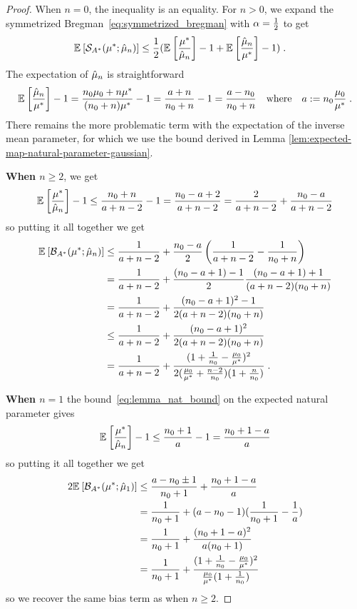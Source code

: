 \begin{subappendices}
\begin{proof}
When $n=0$, the inequality is an equality. 
For $n>0$, we expand the symmetrized Bregman~\eqref{eq:symmetrized_bregman} with $\alpha=\frac{1}{2}$ to get
\begin{align}
	\mathbb{E}_{} \left[ {\mathcal S}_{A^*}(\mu^*; \hat {\mu}_n) \right]  
	&\leq \frac{1}{2} (\mathbb{E}_{} \left[ \frac{\mu^*}{\hat {\mu}_n} \right]  -1  + \mathbb{E}_{} \left[ \frac{\hat {\mu}_n}{\mu^*} \right]  - 1) \; .
\end{align}
The expectation of $\hat {\mu}_n$ is straightforward
\begin{align}
	 \mathbb{E}_{} \left[ \frac{\hat {\mu}_n}{\mu^*} \right]  - 1 
	 = \frac{n_0 \mu_0 + n \mu^*}{(n_0+n)\mu^*} - 1 
	 = \frac{a+n}{n_0+n} - 1 = \frac{a - n_0}{n_0+n}
	 \quad \text{where} \quad
	 a:=n_0\frac{\mu_0}{\mu^*} \; .
\end{align}
There remains the more problematic term with the expectation of the inverse mean parameter, 
for which we use the bound derived in Lemma \ref{lem:expected-map-natural-parameter-gaussian}.

\textbf{When $n\geq 2$}, we get 
\begin{align}
	\mathbb{E}_{} \left[ \frac{\mu^*}{\hat {\mu}_n} \right]  - 1 
	\leq \frac{n_0 + n}{a +n - 2} -1
	= \frac{n_0 - a + 2}{a +n - 2}
	 = \frac{2}{a +n - 2} + \frac{n_0 - a}{a +n - 2}
\end{align}
so putting it all together we get 
\begin{align}
	\mathbb{E}_{} \left[ {\mathcal B}_{A^*}(\mu^*; \hat {\mu}_n) \right]  
	&\leq \frac{1}{a+n-2} + \frac{n_0-a}{2}  \left( \frac{1}{a+n-2} - \frac{1}{n_0+n} \right)\\
	&= \frac{1}{a+n-2} + \frac{(n_0-a + 1) - 1}{2}  \frac{(n_0 - a + 1) + 1}{(a+n-2)(n_0+n)} \\
	&= \frac{1}{a+n-2} + \frac{(n_0 - a +1)^2 - 1}{2(a+n-2)(n_0+n)} \\
	&\leq \frac{1}{a+n-2} + \frac{(n_0 - a +1)^2}{2(a+n-2)(n_0 + n)} \\
	&= \frac{1}{a+n-2} + \frac{(1 + \frac{1}{n_0} - \frac{\mu_0}{\mu^*})^2}{2 (\frac{\mu_0}{\mu^*}+\frac{n-2}{n_0})(1 + \frac{n}{n_0} )} \; .
\end{align}

\textbf{When $n=1$} the bound~\eqref{eq:lemma_nat_bound}  on the expected natural parameter gives
\begin{align}
	\mathbb{E}_{} \left[ \frac{\mu^*}{\hat {\mu}_n} \right]  - 1 
	\leq \frac{n_0 + 1}{a} -1
	= \frac{n_0 +1 - a}{a}
\end{align}
so putting it all together we get
\begin{align}
	2\mathbb{E}_{} \left[ {\mathcal B}_{A^*}(\mu^*; \hat \mu_1) \right]  
	&\leq \frac{a - n_0 \pm 1}{n_0 + 1}  + \frac{n_0 +1 - a }{a} \\
	& = \frac{1}{n_0+1}  + ( a - n_0 - 1)(\frac{1}{n_0+1} - \frac{1}{a}) \\
	& = \frac{1}{n_0+1}  + \frac{(n_0 + 1 -a)^2}{a(n_0+1)}\\
	&= \frac{1}{n_0+1}  + \frac{(1 + \frac{1}{n_0} - \frac{\mu_0}{\mu^*})^2}{\frac{\mu_0}{\mu^*}(1 + \frac{1}{n_0} )} 
\end{align}
so we  recover the same bias term as when $n\geq2$.
\end{proof}


\end{subappendices}
